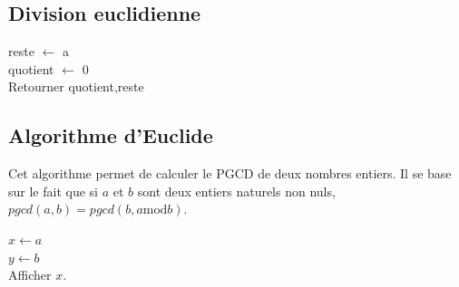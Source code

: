 \documentclass[10pt]{article}
\begin{document}
\subsection{Division euclidienne}
\begin{pseudo}
\begin{algorithm}[H]
reste $\gets$ a\\
quotient $\gets$ 0\\
Retourner quotient,reste
\end{algorithm}
\end{pseudo}

\subsection{Algorithme d'Euclide}
Cet algorithme permet de calculer le PGCD de deux nombres entiers. Il se base sur le fait que si $a$ et $b$ sont deux entiers naturels non nuls, $pgcd(a,b)=pgcd(b, a \text{mod} b)$. 

\begin{pseudo}
\begin{algorithm}[H]
$x\gets a$\\
$y\gets b$\\
Afficher $x$.
\end{algorithm}
\end{pseudo}
\end{document}
